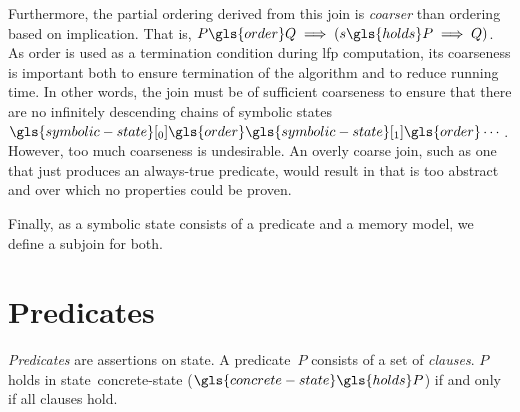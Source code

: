Furthermore, the partial ordering derived from this join is \emph{coarser} than ordering based on implication.
That is, $P\gls{order}Q\implies(s\gls{holds}P\implies Q)$.
As \gls{order} is used as a termination condition during \ac{lfp} computation,
its coarseness is important both to ensure termination of the algorithm and to reduce running time.
In other words, the join must be of sufficient coarseness to ensure that there are no infinitely descending chains of symbolic states $\gls{symbolic-state}[_0] \gls{order} \gls{symbolic-state}[_1] \gls{order} \dotsb$.
However, too much coarseness is undesirable.
An overly coarse join, such as one that just produces an always-true predicate,
would result in  that is too abstract and over which no properties could be proven.

Finally, as a symbolic state consists of a predicate and a memory model, we define a subjoin for both.

\section{Predicates}\label{sec:predicates}
\emph{Predicates} are assertions on state.
A predicate~$P$
consists of a set of \emph{clauses}.
$P$ holds in state~\gls{concrete-state}%
($\gls{concrete-state}\gls{holds}P$) if and only if all clauses hold.


